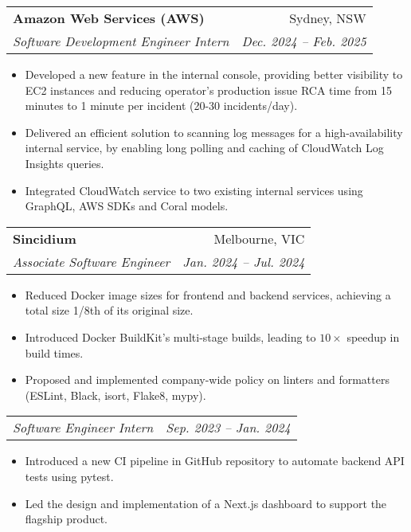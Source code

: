 \documentclass[letterpaper,11pt]{article}
\makeatletter
\newcommand{\resumeItem}[1]{
  \item\small{
    {#1 \vspace{-2pt}}
  }
}
\newcommand{\resumeSubheading}[4]{
  \vspace{-2pt}\item
    \begin{tabular*}{0.97\textwidth}[t]{l@{\extracolsep{\fill}}r}
      \textbf{#1} & #2 \\
      \textit{\small#3} & \textit{\small #4} \\
    \end{tabular*}\vspace{-7pt}
}
\newcommand{\resumeSubSubheading}[2]{
    \item
    \begin{tabular*}{0.97\textwidth}{l@{\extracolsep{\fill}}r}
      \textit{\small#1} & \textit{\small #2} \\
    \end{tabular*}\vspace{-7pt}
}
\newcommand{\resumeItemListStart}{\begin{itemize}}
\newcommand{\resumeItemListEnd}{\end{itemize}\vspace{-5pt}}
\makeatother
\begin{document}
\resumeSubheading
{Amazon Web Services (AWS)}{Sydney, NSW}
{Software Development Engineer Intern}{Dec. 2024 -- Feb. 2025}
\resumeItemListStart
\resumeItem{Developed a new feature in the internal console, providing better visibility to EC2 instances and reducing operator's production issue RCA time from 15 minutes to 1 minute per incident (20-30 incidents/day).}
\resumeItem{Delivered an efficient solution to scanning log messages for a high-availability internal service, by enabling long polling and caching of CloudWatch Log Insights queries.}
\resumeItem{Integrated CloudWatch service to two existing internal services using GraphQL, AWS SDKs and Coral models.}
\resumeItemListEnd


\resumeSubheading
{Sincidium}{Melbourne, VIC}
{Associate Software Engineer}{Jan. 2024 -- Jul. 2024}
\resumeItemListStart
\resumeItem{Reduced Docker image sizes for frontend and backend services, achieving a total size 1/8th of its original size.}
\resumeItem{Introduced Docker BuildKit's multi-stage builds, leading to $10\times$ speedup in build times.}
\resumeItem{Proposed and implemented company-wide policy on linters and formatters (ESLint, Black, isort, Flake8, mypy).}
\resumeItemListEnd

\resumeSubSubheading
{Software Engineer Intern}{Sep. 2023 -- Jan. 2024}
\resumeItemListStart
\resumeItem{Introduced a new CI pipeline in GitHub repository to automate backend API tests using pytest.}
\resumeItem{Led the design and implementation of a Next.js dashboard to support the flagship product.}
\resumeItemListEnd
\end{document}
